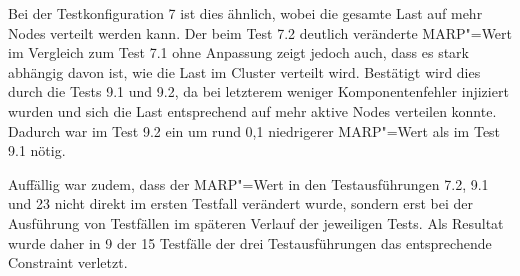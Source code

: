 Bei der Testkonfiguration 7 ist dies ähnlich, wobei die gesamte Last auf mehr Nodes verteilt werden kann.
Der beim Test 7.2 deutlich veränderte \gls{MARP}"=Wert im Vergleich zum Test 7.1 ohne Anpassung zeigt jedoch auch, dass es stark abhängig davon ist, wie die Last im Cluster verteilt wird.
Bestätigt wird dies durch die Tests 9.1 und 9.2, da bei letzterem weniger Komponentenfehler injiziert wurden und sich die Last entsprechend auf mehr aktive Nodes verteilen konnte.
Dadurch war im Test 9.2 ein um rund 0,1 niedrigerer \gls{MARP}"=Wert als im Test 9.1 nötig.

Auffällig war zudem, dass der \gls{MARP}"=Wert in den Testausführungen 7.2, 9.1 und 23 nicht direkt im ersten Testfall verändert wurde, sondern erst bei der Ausführung von Testfällen im späteren Verlauf der jeweiligen Tests.
Als Resultat wurde daher in 9 der 15 Testfälle der drei Testausführungen das entsprechende Constraint verletzt.
